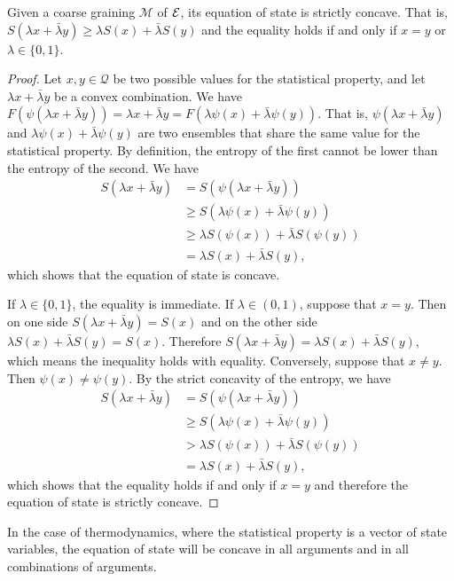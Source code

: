 \begin{mathSection}
\begin{prop}
	Given a coarse graining $\mathcal{M}$ of $\mathcal{E}$, its equation of state is strictly concave. That is, $S(\lambda x + \bar{\lambda} y) \geq \lambda S(x) + \bar{\lambda} S(y)$ and the equality holds if and only if $x=y$ or $\lambda \in \{0,1\}$.
\end{prop}

\begin{proof}
	Let $x, y \in \mathcal{Q}$ be two possible values for the statistical property, and let $\lambda x + \bar{\lambda} y$ be a convex combination. We have $F(\psi(\lambda x + \bar{\lambda} y)) = \lambda x + \bar{\lambda} y = F(\lambda \psi(x) + \bar{\lambda} \psi(y))$. That is, $\psi(\lambda x + \bar{\lambda} y)$ and $\lambda \psi(x) + \bar{\lambda} \psi(y)$ are two ensembles that share the same value for the statistical property. By definition, the entropy of the first cannot be lower than the entropy of the second. We have
	\begin{equation}
		\begin{aligned}
			S(\lambda x + \bar{\lambda} y) &= S(\psi(\lambda x + \bar{\lambda} y)) \\
			&\geq S(\lambda \psi(x) + \bar{\lambda} \psi(y)) \\
			&\geq \lambda S(\psi(x)) + \bar{\lambda} S(\psi(y)) \\
			&= \lambda S(x) + \bar{\lambda} S(y),
		\end{aligned}
	\end{equation}
	which shows that the equation of state is concave.
	
	If $\lambda \in \{0,1\}$, the equality is immediate. If $\lambda \in (0,1)$, suppose that $x=y$. Then on one side $S(\lambda x + \bar{\lambda} y) = S(x)$ and on the other side $\lambda S(x) + \bar{\lambda} S(y) = S(x)$. Therefore $S(\lambda x + \bar{\lambda} y) = \lambda S(x) + \bar{\lambda} S(y)$, which means the inequality holds with equality. Conversely, suppose that $x\neq y$. Then $\psi(x) \neq \psi(y)$. By the strict concavity of the entropy, we have
	\begin{equation}
		\begin{aligned}
			S(\lambda x + \bar{\lambda} y) &= S(\psi(\lambda x + \bar{\lambda} y)) \\
			&\geq S(\lambda \psi(x) + \bar{\lambda} \psi(y)) \\
			&> \lambda S(\psi(x)) + \bar{\lambda} S(\psi(y)) \\
			&= \lambda S(x) + \bar{\lambda} S(y),
		\end{aligned}
	\end{equation}
	which shows that the equality holds if and only if $x=y$ and therefore the equation of state is strictly concave.
\end{proof}

\begin{remark}
	In the case of thermodynamics, where the statistical property is a vector of state variables, the equation of state will be concave in all arguments and in all combinations of arguments.
\end{remark}
\end{mathSection}


